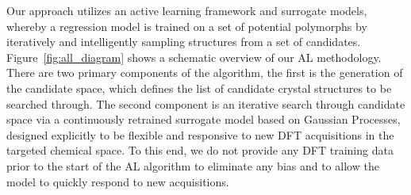 %
%
%
%



%
%
Our approach utilizes an active learning framework and surrogate models,
whereby a regression model is trained on a set of potential polymorphs by iteratively and intelligently sampling structures from a set of candidates.
%
Figure~\ref{fig:all_diagram} shows a schematic overview of our AL methodology.
%
There are two primary components of the algorithm, the first is the generation of the candidate space,
which defines the list of candidate crystal structures to be searched through.
%
The second component is an iterative search through candidate space via a continuously retrained surrogate model based on Gaussian Processes,
designed explicitly to be flexible and responsive to new DFT acquisitions in the targeted chemical space.
%
To this end, we do not provide any DFT training data prior to the start of the AL algorithm to eliminate any bias and to allow the model to quickly respond to new acquisitions.


